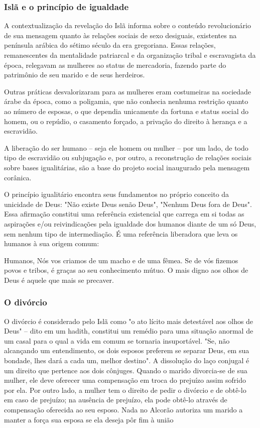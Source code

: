 \documentclass[12pt]{article}
\begin{document}
\subsubsection{Islã e o princípio de igualdade}
A contextualização da revelação do Islã informa sobre o conteúdo revolucionário de sua mensagem quanto às relações sociais de sexo desiguais, existentes na península arábica do sétimo século da era gregoriana. Essas relações, remanescentes da mentalidade patriarcal e da organização tribal e escravagista da época, relegavam as mulheres ao status de mercadoria, fazendo parte do patrimônio de seu marido e de seus herdeiros.
\par Outras práticas desvalorizaram para as mulheres eram costumeiras na sociedade árabe da época, como a poligamia, que não conhecia nenhuma restrição quanto ao número de esposas, o que dependia unicamente da fortuna e status social do homem, ou o repúdio, o casamento forçado, a privação do direito à herança e a escravidão.
\par A liberação do ser humano – seja ele homem ou mulher – por um lado, de todo tipo de escravidão ou subjugação e, por outro, a reconstrução de relações sociais sobre bases igualitárias, são a base do projeto social inaugurado pela mensagem corânica.
\par O princípio igualitário encontra seus fundamentos no próprio conceito da unicidade de Deus: "Não existe Deus senão Deus", "Nenhum Deus fora de Deus". Essa afirmação constitui uma referência existencial que carrega em si todas as aspirações e/ou reivindicações pela igualdade dos humanos diante de um só Deus, sem nenhum tipo de intermediação. É uma referência liberadora que leva os humanos à sua origem comum:
\par Humanos, Nós vos criamos de um macho e de uma fêmea. Se de vós fizemos povos e tribos, é graças ao seu conhecimento mútuo. O mais digno aos olhos de Deus é aquele que mais se precaver.
\subsubsection{O divórcio}
O divórcio é considerado pelo Islã como "o ato lícito mais detestável aos olhos de Deus" – dito em um hadith, constitui um remédio para uma situação anormal de um casal para o qual a vida em comum se tornaria insuportável. "Se, não alcançando um entendimento, os dois esposos preferem se separar Deus, em sua bondade, lhes dará a cada um, melhor destino".  A dissolução do laço conjugal é um direito que pertence aos dois cônjuges. Quando o marido divorcia-se de sua mulher, ele deve oferecer uma compensação em troca do prejuízo assim sofrido por ela. Por outro lado, a mulher tem o direito de pedir o divórcio e de obtê-lo em caso de prejuízo; na ausência de prejuízo, ela pode obtê-lo através de compensação oferecida ao seu esposo. Nada no Alcorão autoriza um marido a manter a força sua esposa se ela deseja pôr fim à união
\end{document}

